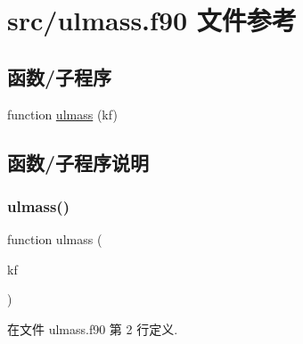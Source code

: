 \hypertarget{ulmass_8f90}{}\section{src/ulmass.f90 文件参考}
\label{ulmass_8f90}
\subsection*{函数/子程序}
\begin{DoxyCompactItemize}
\item 
function \mbox{\hyperlink{ulmass_8f90_a7ec88d536ee9607c95d33dab0b6e25dd}{ulmass}} (kf)
\end{DoxyCompactItemize}


\subsection{函数/子程序说明}
\mbox{\label{ulmass_8f90_a7ec88d536ee9607c95d33dab0b6e25dd}} 
\subsubsection{\texorpdfstring{ulmass()}{ulmass()}}
{\footnotesize\ttfamily function ulmass (\begin{DoxyParamCaption}\item[{}]{kf }\end{DoxyParamCaption})}



在文件 ulmass.\+f90 第 2 行定义.

